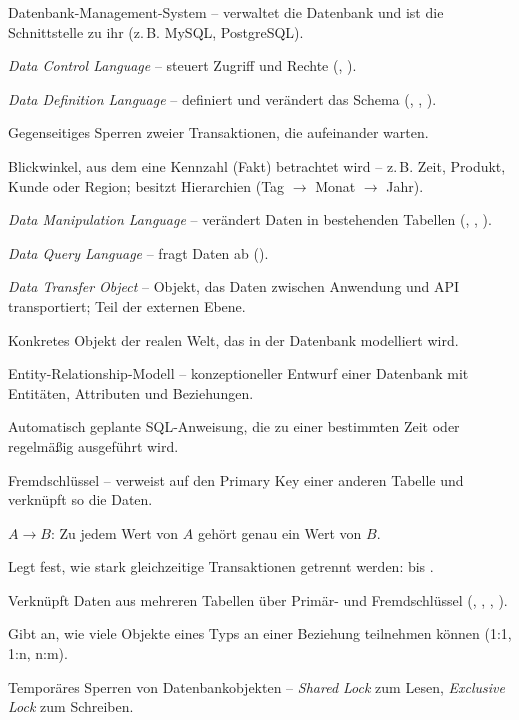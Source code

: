 \begin{description}[style=nextline, itemsep=2pt]
  \item[DBMS] Datenbank-Management-System -- verwaltet die Datenbank und ist die Schnittstelle zu ihr (z.\,B. MySQL, PostgreSQL).
  \item[DCL] \emph{Data Control Language} -- steuert Zugriff und Rechte (, ).
  \item[DDL] \emph{Data Definition Language} -- definiert und verändert das Schema (, , ).
  \item[Deadlock] Gegenseitiges Sperren zweier Transaktionen, die aufeinander warten.
  \item[Dimension] Blickwinkel, aus dem eine Kennzahl (Fakt) betrachtet wird -- z.\,B. Zeit, Produkt, Kunde oder Region; besitzt Hierarchien (Tag $\rightarrow$ Monat $\rightarrow$ Jahr).
  \item[DML] \emph{Data Manipulation Language} -- verändert Daten in bestehenden Tabellen (, , ).
  \item[DQL] \emph{Data Query Language} -- fragt Daten ab ().
  \item[DTO] \emph{Data Transfer Object} -- Objekt, das Daten zwischen Anwendung und API transportiert; Teil der externen Ebene.
  \item[Entität] Konkretes Objekt der realen Welt, das in der Datenbank modelliert wird.
  \item[ERM] Entity-Relationship-Modell -- konzeptioneller Entwurf einer Datenbank mit Entitäten, Attributen und Beziehungen.
  \item[Event] Automatisch geplante SQL-Anweisung, die zu einer bestimmten Zeit oder regelmäßig ausgeführt wird.
  \item[Foreign Key] Fremdschlüssel -- verweist auf den Primary Key einer anderen Tabelle und verknüpft so die Daten.
  \item[Funktionale Abhängigkeit] $A \rightarrow B$: Zu jedem Wert von $A$ gehört genau ein Wert von $B$.
  \item[Isolationsebene] Legt fest, wie stark gleichzeitige Transaktionen getrennt werden:  bis .
  \item[Join] Verknüpft Daten aus mehreren Tabellen über Primär- und Fremdschlüssel (, , , ).
  \item[Kardinalität] Gibt an, wie viele Objekte eines Typs an einer Beziehung teilnehmen können (1:1, 1:n, n:m).
  \item[Locking] Temporäres Sperren von Datenbankobjekten -- \emph{Shared Lock} zum Lesen, \emph{Exclusive Lock} zum Schreiben.

\end{description}
